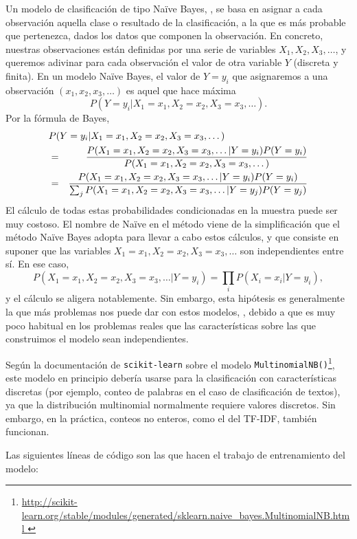 Un modelo de clasificación de tipo Naïve Bayes, \cite{notas_antonio}, se basa en asignar
a cada observación aquella clase o resultado de la clasificación, a la que es más probable que
pertenezca, dados los datos que componen la observación. En concreto, nuestras observaciones
están definidas por una serie de variables $X_1, X_2, X_3,\dots$, y queremos adivinar para cada
observación el valor de otra variable $Y$ (discreta y finita).
En un modelo Naïve Bayes, el valor de $Y=y_i$ 
que asignaremos a una observación $(x_1, x_2,x_3,\dots)$ es aquel que hace máxima
$$P(Y=y_i|X_1=x_1,X_2=x_2,X_3=x_3,\dots).$$
Por la fórmula de Bayes,
\begin{eqnarray*}
\lefteqn{P(Y=y_i|X_1=x_1,X_2=x_2,X_3=x_3,\dots)}\\
 &=& \frac{P(X_1=x_1,X_2=x_2,X_3=x_3,\dots|Y=y_i)P(Y=y_i)}
{P(X_1=x_1,X_2=x_2,X_3=x_3,\dots)}\\
&=&\frac{P(X_1=x_1,X_2=x_2,X_3=x_3,\dots|Y=y_i)P(Y=y_i)}
{\sum_jP(X_1=x_1,X_2=x_2,X_3=x_3,\dots|Y=y_j)P(Y=y_j)}
\end{eqnarray*}
El cálculo de todas estas probabilidades condicionadas en la muestra puede ser muy costoso. El nombre 
de Naïve en el método viene de la simplificación que el método Naïve Bayes adopta para
llevar a cabo estos cálculos, y que consiste en suponer que 
las variables  $X_1=x_1,X_2=x_2,X_3=x_3,\dots$
son independientes entre sí. En ese caso, 
$$P(X_1=x_1,X_2=x_2,X_3=x_3,\dots|Y=y_i) = \prod_i P(X_i=x_i|Y=y_i),$$
y el cálculo se aligera notablemente. Sin embargo, esta hipótesis es generalmente la que más
problemas nos puede dar con estos modelos, \cite{nltk_book}, debido a que es muy poco habitual
en los problemas reales que las características sobre las que construimos el modelo sean 
independientes.

Según la documentación de {\tt  scikit-learn} sobre el modelo {\tt MultinomialNB()}\footnote{\url{http://scikit-learn.org/stable/modules/generated/sklearn.naive_bayes.MultinomialNB.html }},
este modelo en principio debería usarse para la clasificación con características discretas
(por ejemplo, conteo de palabras en el caso de clasificación de textos), ya que la distribución
multinomial normalmente requiere valores discretos. Sin embargo, en la práctica, 
conteos no enteros, como el del TF-IDF, también funcionan.


Las siguientes líneas de código son las que hacen el trabajo de entrenamiento del modelo:



